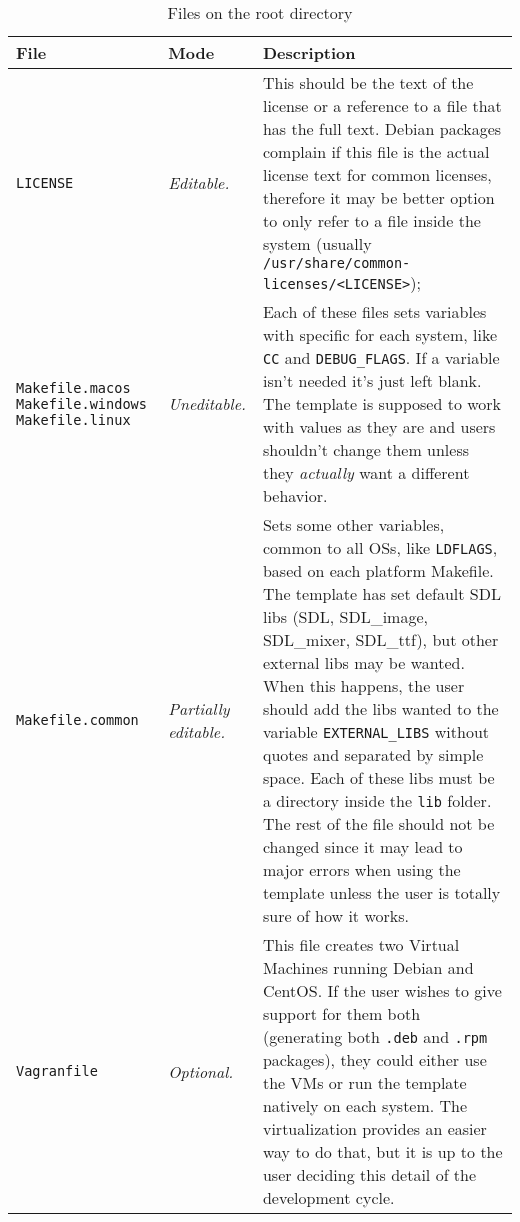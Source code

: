 \begin{longtabu} to \linewidth {XlX[2]}

\caption{Files on the root directory}\label{tab:files_root_dir}\\
\toprule
\textbf{File} & \textbf{Mode} & \textbf{Description} \\
\midrule
\endhead



\texttt{LICENSE} & \emph{Editable.} & This should be the text of the license or a reference to a file that has the full text. Debian packages complain if this file is the actual license text for common licenses, therefore it may be better option to only refer to a file inside the system (usually \texttt{/usr/share/common-licenses/<LICENSE>}); \\ \hline
\texttt{Makefile.macos} \texttt{Makefile.windows} \texttt{Makefile.linux} & \emph{Uneditable.} & Each of these files sets variables with specific for each system, like \texttt{CC} and \texttt{DEBUG\_FLAGS}. If a variable isn't needed it's just left blank. The template is supposed to work with values as they are and users shouldn't change them unless they \emph{actually} want a different behavior. \\ \hline
\texttt{Makefile.common} & \emph{Partially editable.} & Sets some other variables, common to all OSs, like \texttt{LDFLAGS}, based on each platform Makefile. The template has set default SDL libs (SDL, SDL\_image, SDL\_mixer, SDL\_ttf), but other external libs may be wanted. When this happens, the user should add the libs wanted to the variable \texttt{EXTERNAL\_LIBS} without quotes and separated by simple space. Each of these libs must be a directory inside the \texttt{lib} folder. The rest of the file should not be changed since it may lead to major errors when using the template unless the user is totally sure of how it works. \\ \hline
\texttt{Vagranfile} & \emph{Optional.} & This file creates two Virtual Machines running Debian and CentOS. If the user wishes to give support for them both (generating both \texttt{.deb} and \texttt{.rpm} packages), they could either use the VMs or run the template natively on each system. The virtualization provides an easier way to do that, but it is up to the user deciding this detail of the development cycle. \\ \hline

\end{longtabu}
